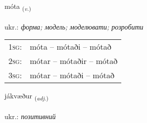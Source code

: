 \documentclass[frontgrid, backgrid]{flacards}\usepackage[]{graphicx}\usepackage[]{xcolor}
\begin{document}
\renewcommand{\blhead}{\vskip5pt {\small\bfseries\footnotesize Sagnorð | дієслово }}
\renewcommand{\bcfoot}{\vskip5pt \hspace{2pt}{\small\bfseries\footnotesize 1K}}


{móta \small{\textsubscript{(\textit{v.})}} \\[1ex] %
\textphonetic{[mouːta]} \\
ukr.: \emph{форма; модель; моделювати; розробити} \\  [2ex]
\renewcommand*{\arraystretch}{0.8}
\begin{tabular}{p{1cm}l}
\textsc{1sg}: & móta -- mótaði -- mótað \\ 
\textsc{2sg}: & mótar -- mótaðir -- mótað \\ 
\textsc{3sg}: & mótar -- mótaði -- mótað \\ 
\end{tabular}
}

\renewcommand{\flhead}{\vskip5pt \fboxsep=0pt {\small\bfseries\footnotesize Lýsingarorð | прикметник}}
\renewcommand{\fcfoot}{\vskip5pt \fboxsep=0pt \hspace{2pt}{\small\bfseries\footnotesize 1K}}

\renewcommand{\blhead}{\vskip5pt {\small\bfseries\footnotesize Lýsingarorð | прикметник }}
\renewcommand{\bcfoot}{\vskip5pt \hspace{2pt}{\small\bfseries\footnotesize 1K}}


{jákvæður \small{\textsubscript{(\textit{adj.})}} \\[1ex] %
\textphonetic{[jauːkʰvaiðʏr]} \\
ukr.: \emph{позитивний} \\  [2ex]
\renewcommand*{\arraystretch}{0.8}
}
\end{document}
